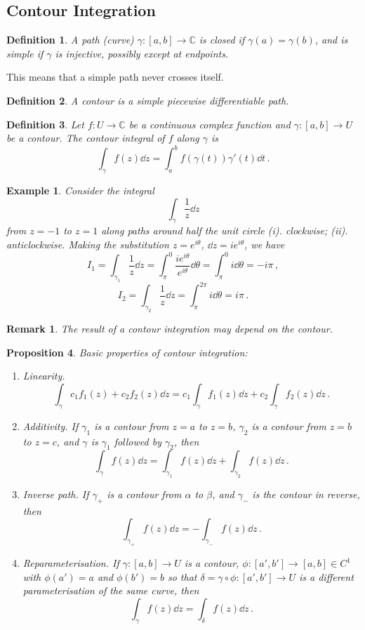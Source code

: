 \documentclass{article}
\theoremstyle{plain}\theoremheaderfont{\normalfont\itshape}\theorembodyfont{\rmfamily}\theoremseparator{.}\newtheorem*{rem}{Remark}\newtheorem*{ex}{Example}\newtheorem*{proof}{Proof}\newtheorem*{altp}{Alternative proof}
\theoremstyle{plain}\theoremheaderfont{\normalfont\bfseries}\theorembodyfont{\rmfamily}\theoremseparator{.}\newtheorem{thm}{Theorem}[section]\newtheorem{lem}[thm]{Lemma}\newtheorem{prop}[thm]{Proposition}\newtheorem*{cor}{Corollary}\newtheorem{defn}[thm]{Definition}\newtheorem{clm}[thm]{Claim}\newtheorem{clminproof}{Claim}
\theoremstyle{break}\theoremheaderfont{\normalfont\itshape}\theorembodyfont{\rmfamily}\theoremseparator{.\medskip}\newtheorem*{proofskip}{Proof}\newtheorem*{exs}{Examples}\newtheorem*{rems}{Remarks}
\theoremstyle{break}\theoremheaderfont{\normalfont\bfseries}\theorembodyfont{\rmfamily}\theoremseparator{.\medskip}\newtheorem{lemskip}[thm]{Lemma}\newtheorem{defnskip}[thm]{Definition}\newtheorem{propskip}[thm]{Proposition}\newtheorem{thmskip}[thm]{Theorem}
\numberwithin{equation}{section}
\begin{document}
	\subsection{Contour Integration}
	\begin{defn}
		A path (curve) \(\gamma:[a,b]\to\mathbb{C}\) is \textit{closed} if \(\gamma(a)=\gamma(b)\), and is \textit{simple} if \(\gamma\) is injective, possibly except at endpoints.
	\end{defn}
	This means that a simple path never crosses itself.
	\begin{defn}
		A \textit{contour} is a simple piecewise differentiable path.
	\end{defn}
	\begin{defn}
		Let \(f:U\to\mathbb{C}\) be a continuous complex function and \(\gamma:[a,b]\to U\) be a contour. The \textit{contour integral} of \(f\) along \(\gamma\) is
		\[\int_\gamma f(z)\dd{z}=\int_{a}^{b}f(\gamma(t))\gamma'(t)\dd{t}\,.\]
	\end{defn}
	\begin{ex}
		Consider the integral
		\[\int_\gamma \frac{1}{z}\dd{z}\]
		from \(z=-1\) to \(z=1\) along paths around half the unit circle (i). clockwise; (ii). anticlockwise. Making the substitution \(z=e^{i\theta}\), \(\dd{z}=ie^{i\theta}\), we have
		\[I_1=\int_{\gamma_1}\frac{1}{z}\dd{z}=\int_{\pi}^{0}\frac{ie^{i\theta}}{e^{i\theta}}\dd{\theta}=\int_{\pi}^{0}i\dd{\theta}=-i\pi\,,\]
		\[I_2=\int_{\gamma_2}\frac{1}{z}\dd{z}=\int_{\pi}^{2\pi}i\dd{\theta}=i\pi\,.\]
	\end{ex}
	\begin{rem}
		The result of a contour integration may depend on the contour.
	\end{rem}
	\begin{prop}
		Basic properties of contour integration:
		\begin{enumerate}[topsep=0pt]
			\item \textit{Linearity.}
			\[\int_\gamma c_1f_1(z)+c_2f_2(z)\dd{z}=c_1\int_\gamma f_1(z)\dd{z}+c_2\int_\gamma f_2(z)\dd{z}\,.\]
			\item \textit{Additivity.} If \(\gamma_1\) is a contour from \(z=a\) to \(z=b\), \(\gamma_2\) is a contour from \(z=b\) to \(z=c\), and \(\gamma\) is \(\gamma_1\) followed by \(\gamma_2\), then
			\[\int_\gamma f(z)\dd{z}=\int_{\gamma_1}f(z)\dd{z}+\int_{\gamma_2}f(z)\dd{z}\,.\]
			\item \textit{Inverse path.} If \(\gamma_+\) is a contour from \(\alpha\) to \(\beta\), and \(\gamma_-\) is the contour in reverse, then
			\[\int_{\gamma_+}f(z)\dd{z}=-\int_{\gamma_-}f(z)\dd{z}\,.\]
			\item \textit{Reparameterisation.} If \(\gamma:[a,b]\to U\) is a contour, \(\phi:[a',b']\to[a,b]\in C^1\) with \(\phi(a')=a\) and \(\phi(b')=b\) so that \(\delta=\gamma\circ\phi:[a',b']\to U\) is a different parameterisation of the same curve, then
			\[\int_\gamma f(z)\dd{z}=\int_\delta f(z)\dd{z}\,.\]
		\end{enumerate}
	\end{prop}
\end{document}
